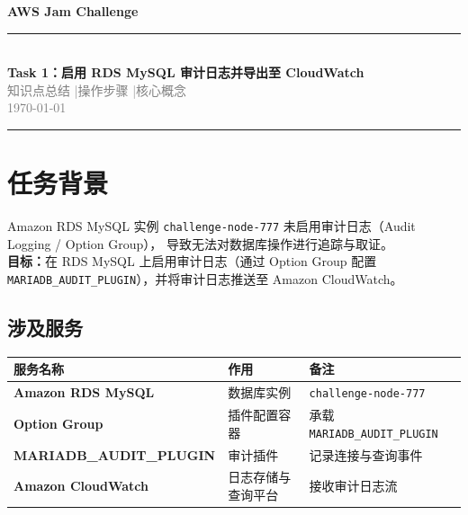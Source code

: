 \documentclass[12pt, a4paper]{article}
\begin{document}
\begin{center}
  {\Huge \textbf{\textcolor{awsdark}{AWS Jam Challenge}}}\\[0.5em]
  {\Large \textcolor{awsorange}{\rule{10cm}{2pt}}}\\[0.5em]
  {\LARGE \textbf{Task 1：启用 RDS MySQL 审计日志并导出至 CloudWatch}}\\[1em]
  {\normalsize \textcolor{gray}{知识点总结 \quad|\quad 操作步骤 \quad|\quad 核心概念}}\\[0.5em]
  {\normalsize \textcolor{gray}{\today}}
\end{center}

\vspace{1em}
\noindent\rule{\textwidth}{0.4pt}
\vspace{1em}

\section{任务背景}

\begin{tcolorbox}[
  colback=noteblue,
  colframe=noteframe,
  title={\textbf{任务描述}},
  fonttitle=\bfseries
]
Amazon RDS MySQL 实例 \texttt{challenge-node-777} 未启用审计日志（Audit Logging / Option Group），
导致无法对数据库操作进行追踪与取证。\\

\textbf{目标：}在 RDS MySQL 上启用审计日志（通过 Option Group 配置
\texttt{MARIADB\_AUDIT\_PLUGIN}），并将审计日志推送至 Amazon CloudWatch。
\end{tcolorbox}

\vspace{0.5em}

\subsection{涉及服务}

\begin{center}
\begin{tabular}{>{\bfseries}lll}
\toprule
服务名称 & 作用 & 备注 \\
\midrule
Amazon RDS MySQL & 数据库实例 & \texttt{challenge-node-777} \\
Option Group & 插件配置容器 & 承载 \texttt{MARIADB\_AUDIT\_PLUGIN} \\
MARIADB\_AUDIT\_PLUGIN & 审计插件 & 记录连接与查询事件 \\
Amazon CloudWatch & 日志存储与查询平台 & 接收审计日志流 \\
\bottomrule
\end{tabular}
\end{center}
\end{document}

